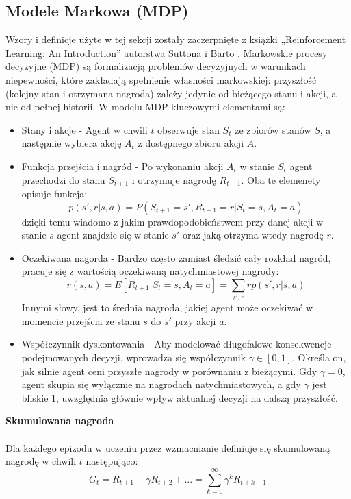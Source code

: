 \documentclass[a4paper, 12pt]{article}
\begin{document}
    \subsection{Modele Markowa (MDP)}
    Wzory i definicje użyte w tej sekcji zostały zaczerpnięte z książki „Reinforcement Learning: An Introduction” autorstwa Suttona i Barto \cite{sutton2018rl}.
    Markowskie procesy decyzyjne (MDP) są formalizacją problemów decyzyjnych w warunkach niepewności, które zakładają spełnienie własności markowskiej: przyszłość (kolejny stan i otrzymana nagroda) zależy jedynie od bieżącego stanu i akcji, a nie od pełnej historii.
    W modelu MDP kluczowymi elementami są:
    \begin{itemize}
        \item Stany i akcje - Agent w chwili \( t \) obserwuje stan \( S_t \) ze zbiorów stanów \( S \), a następnie wybiera akcję \( A_t \) z dostępnego zbioru akcji \( A \).
        \item Funkcja przejścia i nagród - Po wykonaniu akcji \( A_t \) w stanie \( S_t \) agent przechodzi do stanu \( S_{t+1} \) i otrzymuje nagrodę \( R_{t+1} \). Oba te elemenety opisuje funkcja:
        \[ p(s',r|s,a) = P(S_{t+1} = s', R_{t+1} = r | S_t = s, A_t = a)\]
        dzięki temu wiadomo z jakim prawdopodobieństwem przy danej akcji w stanie \( s \) agent znajdzie się w stanie \( s' \) oraz jaką otrzyma wtedy nagrodę \( r \).
        \item Oczekiwana nagorda - Bardzo często zamiast śledzić cały rozkład nagród, pracuje się z wartością oczekiwaną natychmiastowej nagrody:
        \[ r(s,a) = E[R_{t+1} | S_t = s, A_t = a] = \sum_{s',r} r p(s',r|s,a)\]
        Innymi słowy, jest to średnia nagroda, jakiej agent może oczekiwać w momencie przejścia ze stanu \( s \) do \( s' \) przy akcji \( a \).
        \item Współczynnik dyskontowania - Aby modelować długofalowe konsekwencje podejmowanych decyzji, wprowadza się współczynnik \( \gamma \in [0,1] \). Określa on, jak silnie agent ceni przyszłe nagrody w porównaniu z bieżącymi. Gdy \( \gamma = 0 \), agent skupia się wyłącznie na nagrodach natychmiastowych, a gdy \( \gamma \) jest bliskie 1, uwzględnia głównie wpływ aktualnej decyzji na dalszą przyszłość.
    \end{itemize}
    \textbf{Skumulowana nagroda} \\ \\ 
    Dla każdego epizodu w uczeniu przez wzmacnianie definiuje się skumulowaną nagrodę w chwili \( t \) następująco:
    \[ G_t = R_{t+1} + \gamma R_{t+2} + ... = \sum_{k=0}^{\infty} \gamma^k R_{t+k+1} \]
\end{document}
